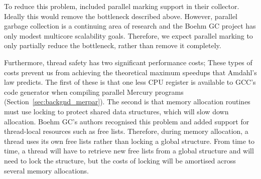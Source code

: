 To reduce this problem,
\citet{boehm:1988:gc} included parallel marking support in their collector.
Ideally this would remove the bottleneck described above.
However,
parallel garbage collection is a continuing area of research and
the Boehm GC project has only modest multicore scalability goals.
Therefore,
we expect parallel marking to only partially reduce the bottleneck,
rather than remove it completely.

Furthermore, thread safety has two significant performance costs;
These types of costs prevent us from achieving the theoretical maximum
speedups that Amdahl's law predicts.
The first of these is that
one less CPU register is available to GCC's code generator when compiling
parallel Mercury programs (Section~\ref{sec:backgnd_merpar}).
The second is that
memory allocation routines must use locking to protect shared data
structures,
which will slow down allocation.
Boehm GC's authors recognised this problem and
added support for thread-local resources such as free lists.
Therefore,
during memory allocation,
a thread uses its own free lists rather than locking a global structure.
From time to time, a thread will have to retrieve new free lists
from a global structure and will need to lock the structure,
but the costs of locking will be amortised across several memory allocations.

